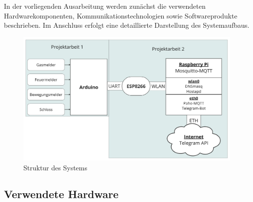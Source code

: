 \documentclass[12pt, letterpaper]{article}
\begin{document}
\par In der vorliegenden Ausarbeitung werden zunächst die verwendeten Hardwarekomponenten, Kommunikationstechnologien sowie Softwareprodukte beschrieben. Im Anschluss erfolgt eine detaillierte Darstellung des Systemaufbaus.
\begin{figure}[h]
  \centering
  \includegraphics[width=\textwidth]{gesamtplan.jpg}
  \caption{Struktur des Systems}
  \label{abb:gesamtplan}
\end{figure}
\subsection{Verwendete Hardware}
\end{document}
